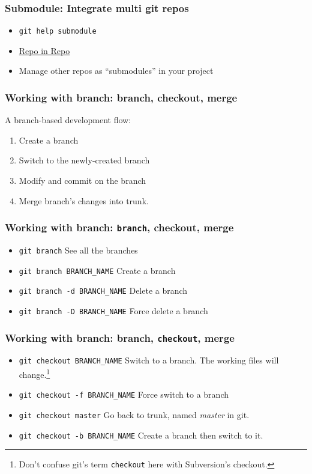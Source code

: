 \documentclass[11pt,ignorenonframetext,]{beamer}
\begin{document}
\begin{frame}[fragile]\frametitle{Submodule: Integrate multi git repos}

\begin{itemize}
\item
  \texttt{git help submodule}
\item
  \href{http://progit.org/book/ch6-6.html}{Repo in Repo}
\item
  Manage other repos as ``submodules'' in your project
\end{itemize}
\end{frame}

\begin{frame}[label=gitbranch]\frametitle{Working with \textbf{branch}: branch, checkout,
merge}

A branch-based development flow:

\begin{enumerate}[1.]
\item
  Create a branch
\item
  Switch to the newly-created branch
\item
  Modify and commit on the branch
\item
  Merge branch's changes into trunk.
\end{enumerate}
\end{frame}

\begin{frame}[fragile]\frametitle{Working with \textbf{branch}:
\texttt{branch}, checkout, merge}

\begin{itemize}
\item
  \texttt{git branch} See all the branches
\item
  \texttt{git branch BRANCH\_NAME} Create a branch
\item
  \texttt{git branch -d BRANCH\_NAME} Delete a branch
\item
  \texttt{git branch -D BRANCH\_NAME} Force delete a branch
\end{itemize}
\end{frame}

\begin{frame}[fragile]\frametitle{Working with \textbf{branch}: branch,
\texttt{checkout}, merge}

\begin{itemize}
\item
  \texttt{git checkout BRANCH\_NAME} Switch to a branch. The working
  files will change.\footnote{Don't confuse git's term \texttt{checkout}
    here with Subversion's checkout.}
\item
  \texttt{git checkout -f BRANCH\_NAME} Force switch to a branch
\item
  \texttt{git checkout master} Go back to trunk, named \emph{master} in
  git.
\item
  \texttt{git checkout -b BRANCH\_NAME} Create a branch then switch to
  it.
\end{itemize}
\end{frame}
\end{document}
